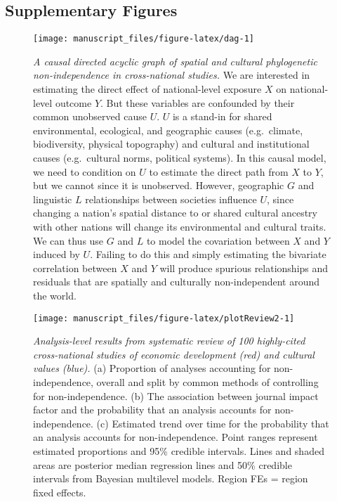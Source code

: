 \documentclass[
  man,floatsintext]{apa6}
\begin{document}
\newpage

\hypertarget{supplementary-figures}{%
\subsection{Supplementary Figures}\label{supplementary-figures}}



\begin{figure}[H]
\texttt{[image: manuscript\_files/figure-latex/dag-1]} \caption{\emph{A causal directed acyclic graph of spatial and cultural phylogenetic non-independence in cross-national studies.} We are interested in estimating the direct effect of national-level exposure \(X\) on national-level outcome \(Y\). But these variables are confounded by their common unobserved cause \(U\). \(U\) is a stand-in for shared environmental, ecological, and geographic causes (e.g.~climate, biodiversity, physical topography) and cultural and institutional causes (e.g.~cultural norms, political systems). In this causal model, we need to condition on \(U\) to estimate the direct path from \(X\) to \(Y\), but we cannot since it is unobserved. However, geographic \(G\) and linguistic \(L\) relationships between societies influence \(U\), since changing a nation's spatial distance to or shared cultural ancestry with other nations will change its environmental and cultural traits. We can thus use \(G\) and \(L\) to model the covariation between \(X\) and \(Y\) induced by \(U\). Failing to do this and simply estimating the bivariate correlation between \(X\) and \(Y\) will produce spurious relationships and residuals that are spatially and culturally non-independent around the world.}\label{fig:dag}
\end{figure}

\newpage



\begin{figure}[H]
\texttt{[image: manuscript\_files/figure-latex/plotReview2-1]} \caption{\emph{Analysis-level results from systematic review of 100 highly-cited cross-national studies of economic development (red) and cultural values (blue).} (a) Proportion of analyses accounting for non-independence, overall and split by common methods of controlling for non-independence. (b) The association between journal impact factor and the probability that an analysis accounts for non-independence. (c) Estimated trend over time for the probability that an analysis accounts for non-independence. Point ranges represent estimated proportions and 95\% credible intervals. Lines and shaded areas are posterior median regression lines and 50\% credible intervals from Bayesian multilevel models. Region FEs = region fixed effects.}\label{fig:plotReview2}
\end{figure}
\end{document}
